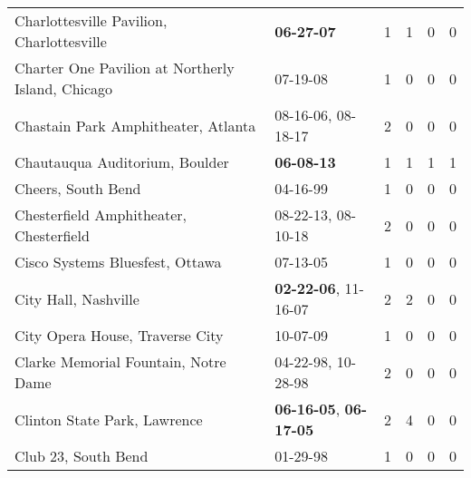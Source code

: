 \begin{longtable}{p{}p{}p{}p{}p{}p{}}
                                    Charlottesville Pavilion, Charlottesville &                                       \textbf{06-27-07\textsuperscript{}} &  1 &  1 &  0 &  0 \\
                            Charter One Pavilion at Northerly Island, Chicago &                                                07-19-08\textsuperscript{} &  1 &  0 &  0 &  0 \\
                                          Chastain Park Amphitheater, Atlanta &                    08-16-06\textsuperscript{}, 08-18-17\textsuperscript{} &  2 &  0 &  0 &  0 \\
                                               Chautauqua Auditorium, Boulder &                                       \textbf{06-08-13\textsuperscript{}} &  1 &  1 &  1 &  1 \\
                                                           Cheers, South Bend &                                                04-16-99\textsuperscript{} &  1 &  0 &  0 &  0 \\
                                      Chesterfield Amphitheater, Chesterfield &                    08-22-13\textsuperscript{}, 08-10-18\textsuperscript{} &  2 &  0 &  0 &  0 \\
                                              Cisco Systems Bluesfest, Ottawa &                                                07-13-05\textsuperscript{} &  1 &  0 &  0 &  0 \\
                                                         City Hall, Nashville &           \textbf{02-22-06\textsuperscript{}}, 11-16-07\textsuperscript{} &  2 &  2 &  0 &  0 \\
                                              City Opera House, Traverse City &                                                10-07-09\textsuperscript{} &  1 &  0 &  0 &  0 \\
                                         Clarke Memorial Fountain, Notre Dame &                    04-22-98\textsuperscript{}, 10-28-98\textsuperscript{} &  2 &  0 &  0 &  0 \\
                                                 Clinton State Park, Lawrence &  \textbf{06-16-05\textsuperscript{}}, \textbf{06-17-05\textsuperscript{}} &  2 &  4 &  0 &  0 \\
                                                          Club 23, South Bend &                                                01-29-98\textsuperscript{} &  1 &  0 &  0 &  0 \\

\end{longtable}
